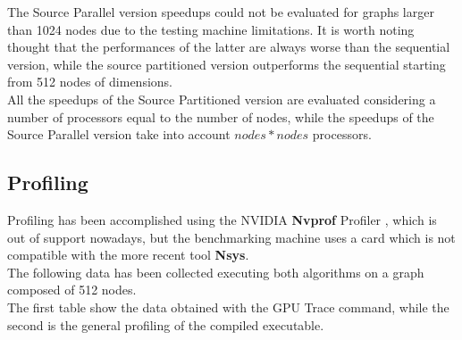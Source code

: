 \documentclass[
	a4paper, %
	12pt, %
]{class}
\begin{document}
The Source Parallel version speedups could not be evaluated for graphs larger than 1024 nodes due to the testing machine
limitations. It is worth noting thought that the performances of the latter are always worse than the sequential version, while the source
partitioned version outperforms the sequential starting from 512 nodes of dimensions. \\

All the speedups of the Source Partitioned version are evaluated considering a number of processors equal to the number of nodes, while the speedups
of the Source Parallel version take into account $nodes * nodes$ processors.

\subsection{Profiling}

Profiling has been accomplished using the NVIDIA \textbf{Nvprof} Profiler \cite{nvprof}, which is out of support nowadays, but the benchmarking machine uses a card which is not compatible
with the more recent tool \textbf{Nsys}. \cite{nsys} \\
The following data has been collected executing both algorithms on a graph composed of 512 nodes. \\

The first table show the data obtained with the GPU Trace command, while the second is the general profiling of the compiled executable. \\
\end{document}
